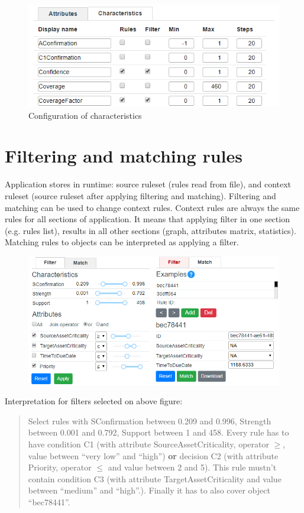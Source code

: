 \documentclass[12pt]{article}
\begin{document}
\begin{figure}[H]
    \centering
    \includegraphics[width=\textwidth]{figures/configure-characteristics.png}
    \caption{Configuration of characteristics}\label{fig:configure-characteristics}
\end{figure}


\section{Filtering and matching rules}

Application stores in runtime: source ruleset (rules read from file), and context ruleset (source ruleset after applying filtering and matching). Filtering and matching can be used to change context rules. Context rules are always the same rules for all sections of application. It means that applying filter in one section (e.g. rules list), results in all other sections (graph, attributes matrix, statistics). Matching rules to objects can be interpreted as applying a filter.

\begin{figure}[H]
    \centering
    \includegraphics[width=\textwidth]{figures/B-filtering.png}
\end{figure}

Interpretation for filters selected on above figure:
\begin{quote}Select rules with SConfirmation between 0.209 and 0.996, Strength between 0.001 and 0.792, Support between 1 and 458. Every rule has to have condition C1 (with attribute SourceAssetCriticality, operator $\ge$, value between ``very low'' and ``high'') \textbf{or} decision C2 (with attribute Priority, operator $\le$ and value between 2 and 5). This rule mustn't contain condition C3 (with attribute TargetAssetCriticality and value between ``medium'' and ``high''.). Finally it has to also cover object ``bec78441''.
\end{quote}
\end{document}
